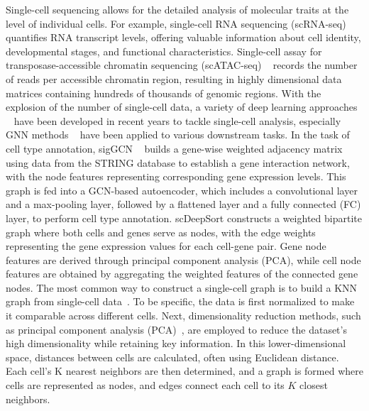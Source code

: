 Single-cell sequencing allows for the detailed analysis of molecular traits at the level of individual cells. For example, single-cell RNA sequencing (scRNA-seq)~\cite{kolodziejczyk2015technology} quantifies RNA transcript levels, offering valuable information about cell identity, developmental stages, and functional characteristics. 
Single-cell assay for transposase-accessible chromatin sequencing (scATAC-seq) ~\cite{buenrostro2013transposition} records the number of reads per accessible chromatin region, resulting in highly dimensional data matrices containing hundreds of thousands of genomic regions. 
With the explosion of the number of single-cell data, a variety of deep learning approaches ~\cite{molho2024deep, ding2024dance, tang2023single, wang2023mem, wen2023single} have been developed in recent years to tackle single-cell analysis, especially GNN methods ~\cite{lu2024graph, ding2024spatialctd, wen2022graph, shao2021scdeepsort, wangSinglecellClassificationUsing2021} have been applied to various downstream tasks. In the task of cell type annotation,
sigGCN ~\cite{wangSinglecellClassificationUsing2021} builds a gene-wise weighted adjacency matrix using data from the STRING database \cite{szklarczykSTRINGV11Protein2019} to establish a gene interaction network, with the node features representing corresponding gene expression levels. This graph is fed into a GCN-based autoencoder, which includes a convolutional layer and a max-pooling layer, followed by a flattened layer and a fully connected (FC) layer, to perform cell type annotation. 
scDeepSort \cite{shao2021scdeepsort} constructs a weighted bipartite graph where both cells and genes serve as nodes, with the edge weights representing the gene expression values for each cell-gene pair. Gene node features are derived through principal component analysis (PCA), while cell node features are obtained by aggregating the weighted features of the connected gene nodes.
The most common way to construct a single-cell graph is to build a KNN graph from single-cell data~\cite{wang2021scgnn}. To be specific, the data is first normalized to make it comparable across different cells. Next, dimensionality reduction methods, such as principal component analysis (PCA)~\cite{mackiewicz1993principal}, are employed to reduce the dataset’s high dimensionality while retaining key information. In this lower-dimensional space, distances between cells are calculated, often using Euclidean distance. Each cell’s K nearest neighbors are then determined, and a graph is formed where cells are represented as nodes, and edges connect each cell to its $K$ closest neighbors.


